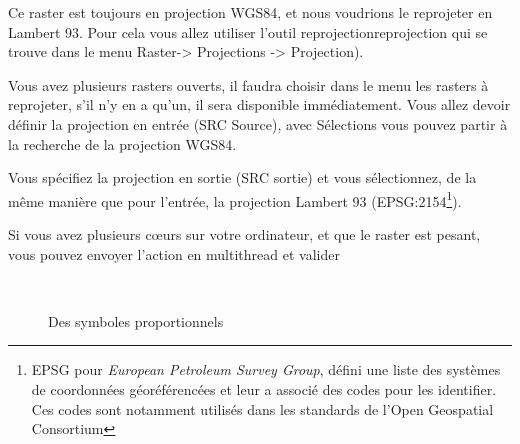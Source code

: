 \documentclass[a4paper, 11pt]{article}
\begin{document}
    Ce raster est toujours en projection WGS84, et nous voudrions le reprojeter en Lambert 93. Pour cela vous allez utiliser l'outil reprojectionreprojection qui se trouve dans le menu Raster-> Projections -> Projection).

    Vous avez plusieurs rasters ouverts, il faudra choisir dans le menu les rasters à reprojeter, s'il n'y en a qu'un, il sera disponible immédiatement. Vous allez devoir définir la projection en entrée (SRC Source), avec Sélections vous pouvez partir à la recherche de la projection WGS84.

    Vous spécifiez la projection en sortie (SRC sortie) et vous sélectionnez, de la même manière que pour l'entrée, la projection Lambert 93 (EPSG:2154\footnote{EPSG pour \textit{European Petroleum Survey Group}, défini une liste des systèmes de coordonnées géoréférencées et leur a associé des codes pour les identifier. Ces codes sont notamment utilisés dans les standards de l'Open Geospatial Consortium}).

    Si vous avez plusieurs cœurs sur votre ordinateur, et que le raster est pesant, vous pouvez envoyer l'action en multithread et valider

    \begin{figure}
    \centering
    \\
      \caption{Des symboles proportionnels}\label{fig:analyseThematique}
    \end{figure}
\end{document}
